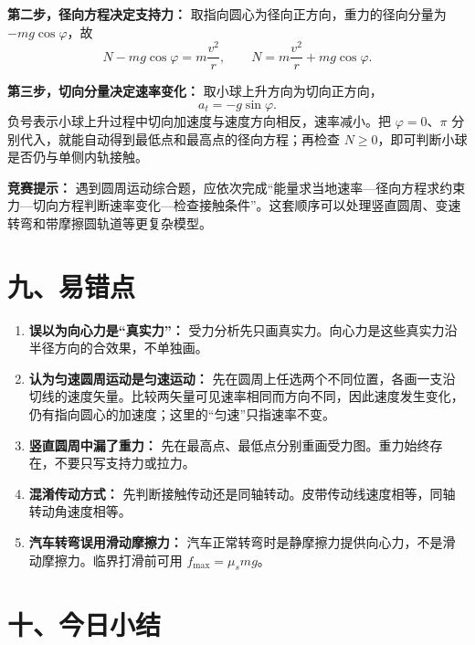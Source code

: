 \begin{competitionbox}
\textbf{第二步，径向方程决定支持力：} 取指向圆心为径向正方向，重力的径向分量为 $-mg\cos\varphi$，故
\[
N-mg\cos\varphi=m\frac{v^2}{r},
\qquad
N=m\frac{v^2}{r}+mg\cos\varphi.
\]

\textbf{第三步，切向分量决定速率变化：} 取小球上升方向为切向正方向，
\[
a_t=-g\sin\varphi.
\]
负号表示小球上升过程中切向加速度与速度方向相反，速率减小。把 $\varphi=0$、$\pi$ 分别代入，就能自动得到最低点和最高点的径向方程；再检查 $N\ge0$，即可判断小球是否仍与单侧内轨接触。

\textbf{竞赛提示：} 遇到圆周运动综合题，应依次完成“能量求当地速率—径向方程求约束力—切向方程判断速率变化—检查接触条件”。这套顺序可以处理竖直圆周、变速转弯和带摩擦圆轨道等更复杂模型。
\end{competitionbox}

\section*{九、易错点}

\begin{mistakebox}
\small
\begin{enumerate}[nosep]
  \item \textbf{误以为向心力是“真实力”：} 受力分析先只画真实力。向心力是这些真实力沿半径方向的合效果，不单独画。

  \item \textbf{认为匀速圆周运动是匀速运动：} 先在圆周上任选两个不同位置，各画一支沿切线的速度矢量。比较两矢量可见速率相同而方向不同，因此速度发生变化，仍有指向圆心的加速度；这里的“匀速”只指速率不变。

  \item \textbf{竖直圆周中漏了重力：} 先在最高点、最低点分别重画受力图。重力始终存在，不要只写支持力或拉力。

  \item \textbf{混淆传动方式：} 先判断接触传动还是同轴转动。皮带传动线速度相等，同轴转动角速度相等。

  \item \textbf{汽车转弯误用滑动摩擦力：} 汽车正常转弯时是静摩擦力提供向心力，不是滑动摩擦力。临界打滑前可用 $f_{\max}=\mu_s mg$。
\end{enumerate}
\end{mistakebox}

\section*{十、今日小结}
\enlargethispage{3\baselineskip}

